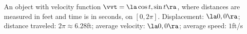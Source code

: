 {An object with velocity function $\vvt = \la \cos t,\sin t\ra$, where distances are measured in feet and time is in seconds, on $[0,2\pi]$.
}
{Displacement: $\la 0,0\ra$; distance traveled: $2\pi \approx 6.28$ft; average velocity: $\la 0,0\ra$; average speed: $1$ft/s
}